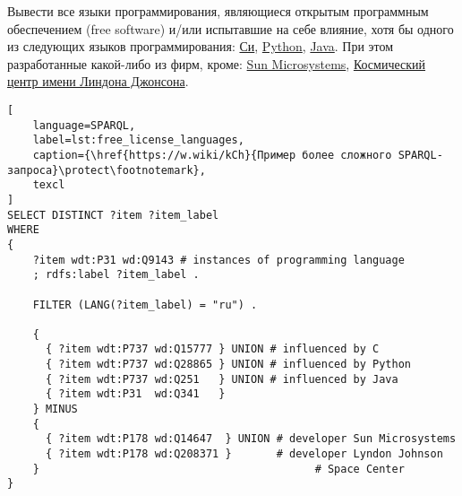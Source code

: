 Вывести все языки программирования, являющиеся открытым программным обеспечением (free software) и/или испытавшие на себе влияние, хотя бы одного из следующих языков программирования: \href{https://en.wikipedia.org/wiki/C_(programming_language)}{Си}, \href{https://ru.wikipedia.org/wiki/Python}{Python}, \href{https://ru.wikipedia.org/wiki/Java}{Java}. При этом разработанные какой-либо из фирм, кроме: \href{https://ru.wikipedia.org/wiki/Sun_Microsystems}{Sun Microsystems}, \href{https://en.wikipedia.org/wiki/Johnson_Space_Center}{Космический центр имени Линдона Джонсона}.

\pagebreak

\begin{lstlisting}[
	language=SPARQL,
	label=lst:free_license_languages,
	caption={\href{https://w.wiki/kCh}{Пример более сложного SPARQL-запроса}\protect\footnotemark},
	texcl
]
SELECT DISTINCT ?item ?item_label
WHERE
{
    ?item wdt:P31 wd:Q9143 # instances of programming language
    ; rdfs:label ?item_label . 

    FILTER (LANG(?item_label) = "ru") . 

    {
      { ?item wdt:P737 wd:Q15777 } UNION # influenced by C
      { ?item wdt:P737 wd:Q28865 } UNION # influenced by Python
      { ?item wdt:P737 wd:Q251   } UNION # influenced by Java
      { ?item wdt:P31  wd:Q341   }
    } MINUS 
  	{ 
      { ?item wdt:P178 wd:Q14647  } UNION # developer Sun Microsystems
      { ?item wdt:P178 wd:Q208371 }       # developer Lyndon Johnson
    }  										    # Space Center
}
\end{lstlisting}


